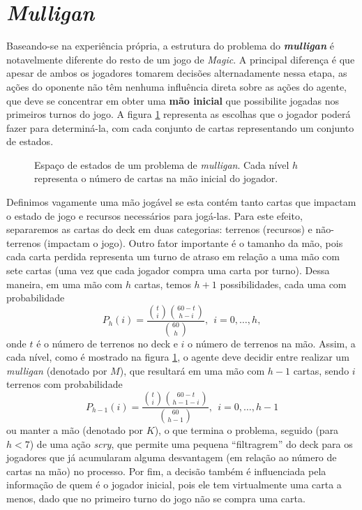 \documentclass{book}
\begin{document}
\section{\textit{Mulligan}}
Baseando-se na experiência própria, a estrutura do problema do
\textbf{\textit{mulligan}} é notavelmente diferente do resto de um jogo
de \textit{Magic}.
A principal diferença é que apesar de ambos os jogadores tomarem
decisões alternadamente nessa etapa, as ações do oponente não têm
nenhuma influência
direta sobre as ações do agente, que deve se concentrar em obter uma
\textbf{mão inicial} que possibilite jogadas nos primeiros turnos do
jogo.
A figura \ref{mulligan} representa as escolhas que o jogador poderá
fazer para determiná-la, com cada conjunto de cartas representando um
conjunto
de estados.

\begin{figure}
  \centering
  \label{mulligan}
  
  \caption{Espaço de estados de um problema de \textit{mulligan}. Cada
nível $h$ representa o número de cartas na mão inicial do jogador.}
\end{figure}

Definimos vagamente uma mão jogável se esta contém tanto cartas que
impactam o estado de jogo e recursos necessários para jogá-las.
Para este efeito, separaremos as cartas do deck em duas categorias:
terrenos (recursos) e não-terrenos (impactam o jogo).
Outro fator importante é o tamanho da mão, pois cada carta perdida
representa um turno de atraso em relação a uma mão com sete cartas (uma
vez que cada jogador compra
uma carta por turno). Dessa maneira, em uma mão com $h$ cartas, temos
$h+1$ possibilidades, cada uma com probabilidade
\begin{equation} \label{eq:stateprob} P_h(i) =
\frac{\binom{t}{i}\binom{60 - t}{h - i}}{\binom{60}{h}}, \ \
i = 0,\ldots, h, \end{equation} onde $t$ é o número de terrenos no deck
e $i$ o
número de terrenos
na mão. Assim, a cada nível, como é mostrado na figura \ref{mulligan}, o
agente deve decidir entre realizar um \textit{mulligan}
(denotado por $M$), que resultará em uma mão com $h-1$ cartas, sendo $i$
terrenos com probabilidade
 \[ P_{h - 1}(i) = \frac{\binom{t}{i}\binom{60 - t}{h - 1 -
i}}{\binom{60}{h - 1}}, \ \  i = 0,\ldots, h - 1\]
 ou manter a mão (denotado por $K$), o que termina o problema, seguido
(para $h < 7$) de uma ação \textit{scry}, que permite uma pequena
``filtragrem''
 do deck para os jogadores que já acumularam alguma desvantagem (em
relação ao número de cartas na mão) no processo. Por fim, a decisão
também é influenciada
 pela informação de quem é o jogador inicial, pois ele tem virtualmente
uma carta a menos, dado que no primeiro turno do jogo não se compra uma
carta.
\end{document}
